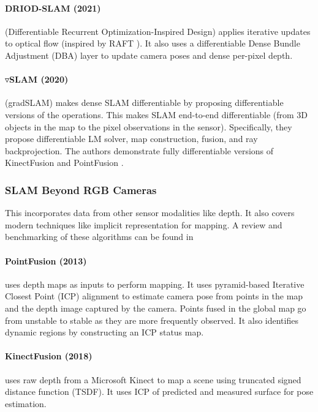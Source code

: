 \paragraph{DRIOD-SLAM (2021) \cite{Teed2021DROIDSLAMDV}}
(Differentiable Recurrent Optimization-Inspired Design) applies
iterative updates to optical flow (inspired by RAFT
\cite{Teed2020RAFTRA}). It also uses a differentiable Dense Bundle
Adjustment (DBA) layer to update camera poses and dense per-pixel
depth.

\paragraph{$\triangledown$SLAM (2020) \cite{Jatavallabhula2019SLAMDS}}
(gradSLAM) makes dense SLAM differentiable by proposing differentiable
versions of the operations. This makes SLAM end-to-end differentiable
(from 3D objects in the map to the pixel observations in the sensor).
Specifically, they propose differentiable LM solver, map construction,
fusion, and ray backprojection. The authors demonstrate fully
differentiable versions of KinectFusion
\cite{Newcombe2011KinectFusionRD} and PointFusion
\cite{Keller2013RealTime3R}.

\subsubsection{SLAM Beyond RGB Cameras}

This incorporates data from other sensor modalities like depth. It
also covers modern techniques like implicit representation for
mapping. A review and benchmarking of these algorithms can be found in
\cite{Tosi2024HowNA, Sturm2012ABF}

\paragraph{PointFusion (2013) \cite{Keller2013RealTime3R}} uses depth
maps as inputs to perform mapping. It uses pyramid-based Iterative
Closest Point (ICP) alignment to estimate camera pose from points in
the map and the depth image captured by the camera. Points fused in 
the global map go from unstable to stable as they are more frequently
observed. It also identifies dynamic regions by constructing an ICP
status map.

\paragraph{KinectFusion (2018) \cite{Newcombe2011KinectFusionRD}} uses
raw depth from a Microsoft Kinect to map a scene using truncated
signed distance function (TSDF). It uses ICP of predicted and measured
surface for pose estimation.

